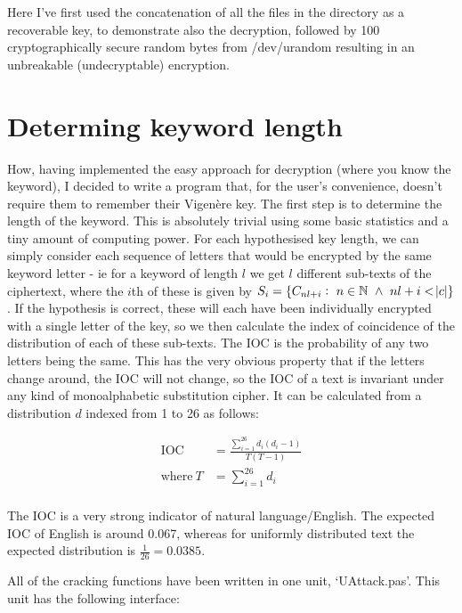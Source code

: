 \documentclass{article}
\begin{document}
    Here I've first used the concatenation of all the files in the directory as
    a recoverable key, to demonstrate also the decryption, followed by 100
    cryptographically secure random bytes from /dev/urandom resulting in an
    unbreakable (undecryptable) encryption.

    \section{Determing keyword length}

    How, having implemented the easy approach for decryption (where you know
    the keyword), I decided to write a program that, for the user's
    convenience, doesn't require them to remember their Vigen\`ere key. The
    first step is to determine the length of the keyword. This is absolutely
    trivial using some basic statistics and a tiny amount of computing power.
    For each hypothesised key length, we can simply consider each sequence of
    letters that would be encrypted by the same keyword letter - ie for a
    keyword of length $l$ we get $l$ different sub-texts of the ciphertext,
    where the $i$th of these is given by $S_i = \{C_{nl + i}:\ n \in \mathbb{N}
    \ \land\ nl + i < \abs{c}\}$. If the hypothesis is correct, these will each
    have been individually encrypted with a single letter of the key, so  we
    then calculate the index of coincidence of the distribution of each of
    these sub-texts. The IOC is the probability of any two letters being the
    same. This has the very obvious property that if the letters change around,
    the IOC will not change, so the IOC of a text is invariant under any kind
    of monoalphabetic substitution cipher. It can be calculated from a
    distribution $d$ indexed from 1 to 26 as follows:

\begin{align*}
    \text{IOC}\ &= \frac{\sum\limits_{i = 1}^{26} d_i (d_i - 1)}{T (T - 1)}\\
    \text{where}\ T &= \sum\limits_{i = 1}^{26} d_i\\
\end{align*}

    The IOC is a very strong indicator of natural language/English. The
    expected IOC of English is around 0.067, whereas for uniformly distributed
    text the expected distribution is $\frac{1}{26} = 0.0385$.

    All of the cracking functions have been written in one unit, `UAttack.pas'.
    This unit has the following interface:
\end{document}
